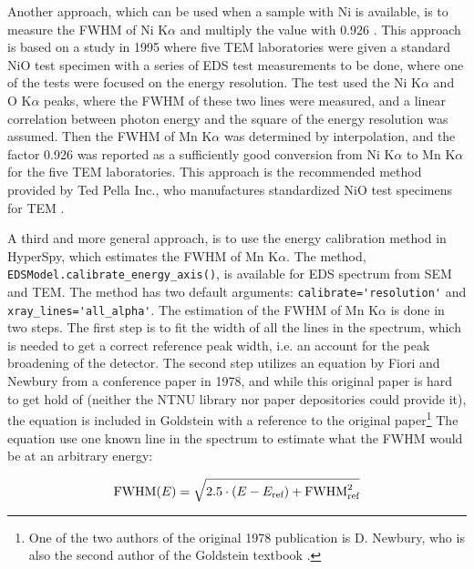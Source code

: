 Another approach, which can be used when a sample with Ni is available, is to measure the FWHM of Ni K$\alpha$ and multiply the value with $0.926$ \cite{bennett_egerton_1995}.
This approach is based on a study in 1995 \cite{bennett_egerton_1995} where five TEM laboratories were given a standard NiO test specimen with a series of EDS test measurements to be done, where one of the tests were focused on the energy resolution.
The test used the Ni K$\alpha$ and O K$\alpha$ peaks, where the FWHM of these two lines were measured, and a linear correlation between photon energy and the square of the energy resolution was assumed.
Then the FWHM of Mn K$\alpha$ was determined by interpolation, and the factor 0.926 was reported as a sufficiently good conversion from Ni K$\alpha$ to Mn K$\alpha$ for the five TEM laboratories.
This approach is the recommended method provided by Ted Pella Inc., who manufactures standardized NiO test specimens for TEM \cite{egerton_nio_characterization_1994,ted_pella_nio_tem_2019}.


A third and more general approach, is to use the energy calibration method in HyperSpy, which estimates the FWHM of Mn K$\alpha$.
The method, \verb|EDSModel.calibrate_energy_axis()|, is available for EDS spectrum from SEM and TEM.
The method has two default arguments: \verb|calibrate='resolution'| and \verb|xray_lines='all_alpha'|.
The estimation of the FWHM of Mn K$\alpha$ is done in two steps.
The first step is to fit the width of all the lines in the spectrum, which is needed to get a correct reference peak width, i.e. an account for the peak broadening of the detector.
The second step utilizes an equation by Fiori and Newbury from a conference paper in 1978, and while this original paper is hard to get hold of (neither the NTNU library nor paper depositories could provide it), the equation is included in Goldstein \cite[Ch. 16.1.1]{goldstein_scanning_2018} with a reference to the original paper\footnote{One of the two authors of the original 1978 publication is D. Newbury, who is also the second author of the Goldstein textbook \cite{goldstein_scanning_2018}.}
The equation use one known line in the spectrum to estimate what the FWHM would be at an arbitrary energy:

\begin{equation}
    \label{eq:estimateFWHM}
    \textnormal{FWHM}(E) =  \sqrt{2.5 \cdot (E - E_\textnormal{ref}) + \textnormal{FWHM}^2_{\textnormal{ref}}}
\end{equation}

